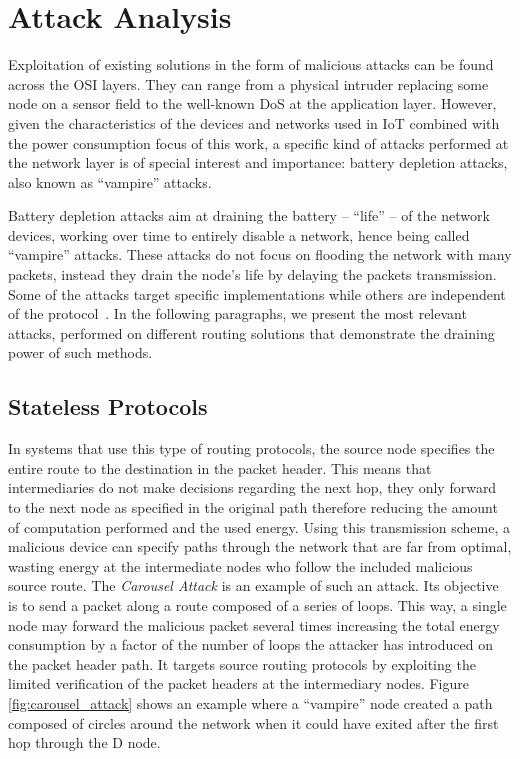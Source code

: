 \documentclass{llncs}
\begin{document}
\section{Attack Analysis}
\label{sec:attack_analysis}
Exploitation of existing solutions in the form of malicious attacks can be found across the \ac{OSI} layers. 
They can range from a physical intruder replacing some node on a sensor field to the well-known \ac{DoS} at the application layer. 
However, given the characteristics of the devices and networks used in \ac{IoT} combined with the power consumption focus of this work, a specific kind of attacks performed at the network layer is of special interest and importance: battery depletion attacks, also known as ``vampire'' attacks.

Battery depletion attacks aim at draining the battery -- ``life'' -- of the network devices, working over time to entirely disable a network, hence being called ``vampire'' attacks. 
These attacks do not focus on flooding the network with many packets, instead they drain the node's life by delaying the packets transmission. 
Some of the attacks target specific implementations while others are independent of the protocol~\cite{Vasserman2013}\cite{Pongle2015}. 
In the following paragraphs, we present the most relevant attacks, performed on different routing solutions that demonstrate the draining power of such methods.

\subsection{Stateless Protocols}
\label{sec:source_routing}
In systems that use this type of routing protocols, the source node specifies the entire route to the destination in the packet header. 
This means that intermediaries do not make decisions regarding the next hop, they only forward to the next node as specified in the original path therefore reducing the amount of computation performed and the used energy. 
Using this transmission scheme, a malicious device can specify paths through the network that are far from optimal, wasting energy at the intermediate nodes who follow the included malicious source route. 
The \emph{Carousel Attack} is an example of such an attack. 
Its objective is to send a packet along a route composed of a series of loops. 
This way, a single node may forward the malicious packet several times increasing the total energy consumption by a factor of the number of loops the attacker has introduced on the packet header path. 
It targets source routing protocols by exploiting the limited verification of the packet headers at the intermediary nodes. 
Figure \ref{fig:carousel_attack} shows an example where a ``vampire'' node created a path composed of circles around the network when it could have exited after the first hop through the D node.
 
\end{document}

